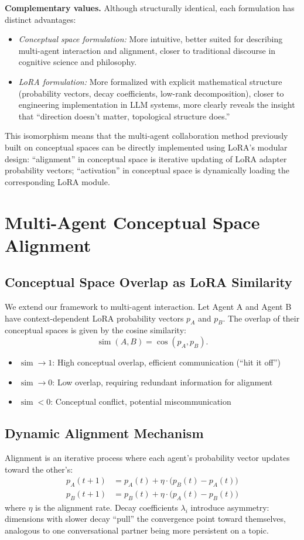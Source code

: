 \documentclass[11pt, a4paper]{article}
\begin{document}
\noindent\textbf{Complementary values.} Although structurally identical, each formulation has distinct advantages:
\begin{itemize}
  \item \emph{Conceptual space formulation:} More intuitive, better suited for describing multi-agent interaction and alignment, closer to traditional discourse in cognitive science and philosophy.
  \item \emph{LoRA formulation:} More formalized with explicit mathematical structure (probability vectors, decay coefficients, low-rank decomposition), closer to engineering implementation in LLM systems, more clearly reveals the insight that ``direction doesn't matter, topological structure does.''
\end{itemize}
This isomorphism means that the multi-agent collaboration method previously built on conceptual spaces can be directly implemented using LoRA's modular design: ``alignment'' in conceptual space is iterative updating of LoRA adapter probability vectors; ``activation'' in conceptual space is dynamically loading the corresponding LoRA module.

\section{Multi-Agent Conceptual Space Alignment}

\subsection{Conceptual Space Overlap as LoRA Similarity}
We extend our framework to multi-agent interaction. Let Agent A and Agent B have context-dependent LoRA probability vectors $p_A$ and $p_B$. The overlap of their conceptual spaces is given by the cosine similarity:
\[
  \operatorname{sim}(A, B) = \cos(p_A, p_B).
\]
\begin{itemize}
  \item $\operatorname{sim} \to 1$: High conceptual overlap, efficient communication (``hit it off'')
  \item $\operatorname{sim} \to 0$: Low overlap, requiring redundant information for alignment
  \item $\operatorname{sim} < 0$: Conceptual conflict, potential miscommunication
\end{itemize}

\subsection{Dynamic Alignment Mechanism}
Alignment is an iterative process where each agent's probability vector updates toward the other's:
\begin{align*}
  p_A(t{+}1) &= p_A(t) + \eta \cdot \bigl(p_B(t) - p_A(t)\bigr)\\
  p_B(t{+}1) &= p_B(t) + \eta \cdot \bigl(p_A(t) - p_B(t)\bigr)
\end{align*}
where $\eta$ is the alignment rate. Decay coefficients $\lambda_i$ introduce asymmetry: dimensions with slower decay ``pull'' the convergence point toward themselves, analogous to one conversational partner being more persistent on a topic.
\end{document}
